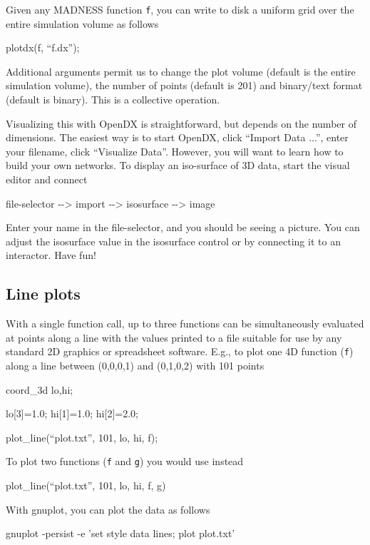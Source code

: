 \documentclass[letterpaper]{article}
\begin{document}
Given any MADNESS function \texttt{f}, you can write to disk a uniform grid over the entire simulation volume as follows

{\ttfamily
plotdx(f, ``f.dx'');}


\bigskip

Additional arguments permit us to change the plot volume (default is the entire simulation volume), the number of points
(default is 201) and binary/text format (default is binary). This is a collective operation.

Visualizing this with OpenDX is straightforward, but depends on the number of dimensions. The easiest way is to start
OpenDX, click ``Import Data ...'', enter your filename, click ``Visualize Data''. However, you will want to learn how
to build your own networks. To display an iso-surface of 3D data, start the visual editor and connect

{\ttfamily
file-selector -{}-{\textgreater} import -{}-{\textgreater} isosurface -{}-{\textgreater} image}

Enter your name in the file-selector, and you should be seeing a picture. You can adjust the isosurface value in the
isosurface control or by connecting it to an interactor. Have fun!

\subsection{Line plots}
With a single function call, up to three functions can be simultaneously evaluated at points along a line with the
values printed to a file suitable for use by any standard 2D graphics or spreadsheet software. E.g., to plot one 4D
function (\texttt{f}) along a line between (0,0,0,1) and (0,1,0,2) with 101 points

{\ttfamily
coord\_3d lo,hi;}

{\ttfamily
lo[3]=1.0; hi[1]=1.0; hi[2]=2.0;}

{\ttfamily
plot\_line(``plot.txt'', 101, lo, hi, f);}

To plot two functions (\texttt{f} and \texttt{g}) you would use instead

{\ttfamily
plot\_line(``plot.txt'', 101, lo, hi, f, g)}


\bigskip

With gnuplot, you can plot the data as follows

{\ttfamily
gnuplot -persist -e 'set style data lines; plot {\textquotedbl}plot.txt{\textquotedbl}'}


\bigskip
\end{document}
